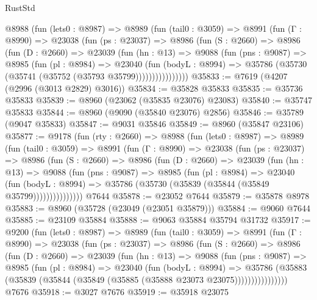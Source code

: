 \begin{lexlean}{RustStd}
\begin{coremodule}
      @8988
        (fun (lets0 : @8987) =>
        @8989
          (fun (tail0 : @3059) =>
          @8991
            (fun (Γ : @8990) =>
            @23038
              (fun (ps : @23037) =>
              @8986
                (fun (S : @2660) =>
                @8986
                  (fun (D : @2660) =>
                  @23039
                    (fun (hn : @13) =>
                    @9088
                      (fun (pns : @9087) =>
                      @8985
                        (fun (pl : @8984) =>
                        @23040
                          (fun (bodyL : @8994) =>
                          @35786 (@35730 (@35741 (@35752 (@35793 @35799))))))))))))))))
@35833 := @7619 (@4207 (@2996 (@3013 @2829) @3016))
@35834 := @35828 @35833
@35835 := @35736 @35833
@35839 := @8960 (@23062 (@35835 @23076) @23083)
@35840 := @35747 @35833
@35844 := @8960 (@9090 (@35840 @23076) @2856)
@35846 := @35789 (@9047 @35833)
@35847 := @9031 @35846
@35849 := @8960 (@35847 @23106)
@35877 := @9178
    (fun (rty : @2660) =>
    @8988
      (fun (lets0 : @8987) =>
      @8989
        (fun (tail0 : @3059) =>
        @8991
          (fun (Γ : @8990) =>
          @23038
            (fun (ps : @23037) =>
            @8986
              (fun (S : @2660) =>
              @8986
                (fun (D : @2660) =>
                @23039
                  (fun (hn : @13) =>
                  @9088
                    (fun (pns : @9087) =>
                    @8985
                      (fun (pl : @8984) =>
                      @23040
                        (fun (bodyL : @8994) =>
                        @35786 (@35730 (@35839 (@35844 (@35849 @35799)))))))))))))))
    @7644
@35878 := @23052 @7644
@35879 := @35878 @8978
@35883 := @8960 (@35728 (@23049 (@23051 @35879)))
@35884 := @9060 @7644
@35885 := @23109 @35884
@35888 := @9063 @35884 @35794 @31732
@35917 := @9200
    (fun (lets0 : @8987) =>
    @8989
      (fun (tail0 : @3059) =>
      @8991
        (fun (Γ : @8990) =>
        @23038
          (fun (ps : @23037) =>
          @8986
            (fun (S : @2660) =>
            @8986
              (fun (D : @2660) =>
              @23039
                (fun (hn : @13) =>
                @9088
                  (fun (pns : @9087) =>
                  @8985
                    (fun (pl : @8984) =>
                    @23040
                      (fun (bodyL : @8994) =>
                      @35786
                        (@35883
                          (@35839 (@35844 (@35849 (@35885 (@35888 @23073 @23075))))))))))))))))
    @7676
@35918 := @3027 @7676
@35919 := @35918 @23075

\end{coremodule}
\end{lexlean}
